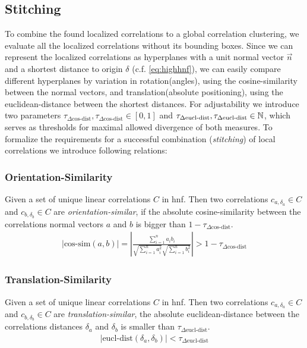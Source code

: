 \subsection{Stitching}\label{ssec:stitching}

To combine the found localized correlations to a global correlation clustering, we evaluate all the localized correlations without its bounding boxes. Since we can represent the localized correlations as hyperplanes with a unit normal vector $\vec{n}$ and a shortest distance to origin $\delta$ (c.f. \autoref{eq:highhnf}), we can easily compare different hyperplanes by variation in rotation(angles), using the cosine-similarity between the normal vectors, and translation(absolute positioning), using the euclidean-distance between the shortest distances. For adjustability we introduce two parameters $\tau_{\Delta \text{cos-dist}}, \tau_{\Delta \text{cos-dist}} \in [0,1]$ and $\tau_{\Delta \text{eucl-dist}}, \tau_{\Delta \text{eucl-dist}} \in \mathbb{N}$, which serves as thresholds for maximal allowed divergence of both measures. To formalize the requirements for a successful combination (\textit{stitching}) of local correlations we introduce following relations:

\subsubsection*{Orientation-Similarity}
Given a set of unique linear correlations $C$ in \gls{hnf}. Then two correlations $c_{a,\delta_a} \in C$ and $c_{b,\delta_b} \in C$ are \textit{orientation-similar}, if the absolute cosine-similarity between the correlations normal vectors $a$ and $b$ is bigger than $1 - \tau_{\Delta \text{cos-dist}}$.
\begin{align}\label{eq:cosdist}
    |\text{cos-sim}(a,b)| = \left|\frac{\sum_{i=1}^{n} a_{i} b_{i}}{\sqrt{\sum_{i=1}^{n} a_{i}^{2}} \sqrt{\sum_{i=1}^{n} b_{i}^{2}}}\right| > 1 - \tau_{\Delta \text{cos-dist}}
\end{align}

\subsubsection*{Translation-Similarity}
Given a set of unique linear correlations $C$ in \gls{hnf}. Then two correlations $c_{a,\delta_a} \in C$ and $c_{b,\delta_b} \in C$ are \textit{translation-similar}, the absolute euclidean-distance between the correlations distances $\delta_a$ and $\delta_b$ is smaller than $\tau_{\Delta \text{eucl-dist}}$.
\begin{align}\label{eq:eucldist}
    |\text{eucl-dist}(\delta_a,\delta_b)| < \tau_{\Delta \text{eucl-dist}}
\end{align}

